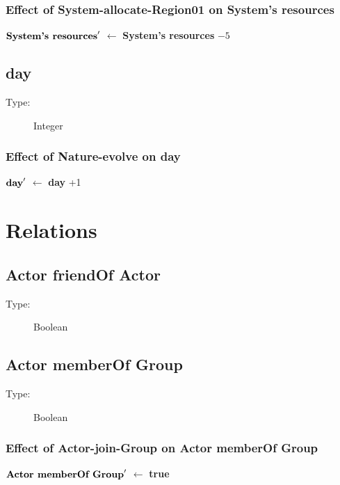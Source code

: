 \documentclass{article}%
\begin{document}
\subsubsection{Effect of System{-}allocate{-}Region01 on System's resources}%
\label{ssubsec:Effect of System{-}allocate{-}Region01 on System's resources}%
\begin{flushleft}%
$\mbox{\textbf{System's resources}} '$%
$\leftarrow$%
\textbf{System's resources}%
${-}5$%
\end{flushleft}

%
\subsection{day}%
\label{subsec:day}%
\begin{description}%
\item[Type:]%
Integer%
\end{description}%
\subsubsection{Effect of Nature{-}evolve on day}%
\label{ssubsec:Effect of Nature{-}evolve on day}%
\begin{flushleft}%
$\mbox{\textbf{day}} '$%
$\leftarrow$%
\textbf{day}%
+1%
\end{flushleft}

%
\section{Relations}%
\label{sec:Relations}%
\subsection{Actor friendOf Actor}%
\label{subsec:Actor friendOf Actor}%
\begin{description}%
\item[Type:]%
Boolean%
\end{description}

%
\subsection{Actor memberOf Group}%
\label{subsec:Actor memberOf Group}%
\begin{description}%
\item[Type:]%
Boolean%
\end{description}%
\subsubsection{Effect of Actor{-}join{-}Group on Actor memberOf Group}%
\label{ssubsec:Effect of Actor{-}join{-}Group on Actor memberOf Group}%
\begin{flushleft}%
$\mbox{\textbf{Actor memberOf Group}} '$%
$\leftarrow$%
\textbf{true}%
\end{flushleft}
\end{document}
